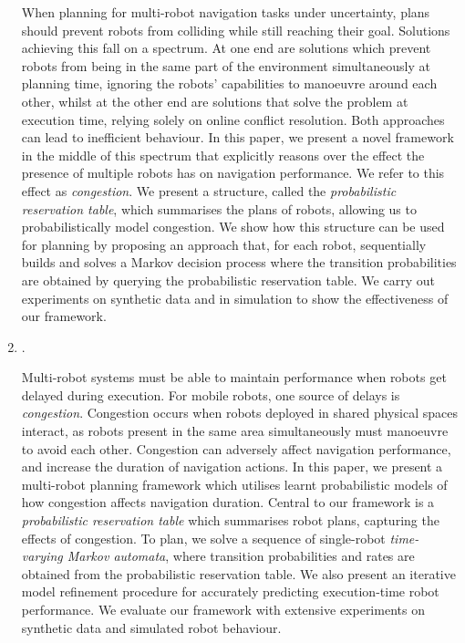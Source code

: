 \documentclass[12pt]{article}
\begin{document}
\begin{enumerate}
When planning for multi-robot navigation tasks under uncertainty, plans should prevent robots from colliding while still reaching their goal. 
%
Solutions achieving this fall on a spectrum. 
%
At one end are solutions which prevent robots from being in the same part of the environment simultaneously at planning time, ignoring the robots' capabilities to manoeuvre around each other, whilst at the other end are solutions that solve the problem at execution time, relying solely on online conflict resolution. 
%
Both approaches can lead to inefficient behaviour. 
%
In this paper, we present a novel framework in the middle of this spectrum that explicitly reasons over the effect the presence of multiple robots has on navigation performance. 
%
We refer to this effect as \emph{congestion}. 
%
We present a structure, called the \emph{probabilistic reservation table}, which summarises the plans of robots, allowing us to probabilistically model congestion.
%
We show how this structure can be used for planning by proposing an approach that, for each robot, sequentially builds and solves a Markov decision process where the transition probabilities are obtained by querying the probabilistic reservation table.
%
We carry out experiments on synthetic data and in simulation to show the effectiveness of our framework.

\item {}.

Multi-robot systems must be able to maintain performance when robots get delayed during execution.
%
For mobile robots, one source of delays is \emph{congestion}.
%
Congestion occurs when robots deployed in shared physical spaces interact, as robots present in the same area simultaneously must manoeuvre to avoid each other.
%
Congestion can adversely affect navigation performance, and increase the duration of navigation actions.
%
In this paper, we present a multi-robot planning framework which utilises learnt probabilistic models of how congestion affects navigation duration. 
%
Central to our framework is a \emph{probabilistic reservation table} which summarises robot plans, capturing the effects of congestion.
%
To plan, we solve a sequence of single-robot \emph{time-varying Markov automata}, where transition probabilities and rates are obtained from the probabilistic reservation table.
% 
We also present an iterative model refinement procedure for accurately predicting execution-time robot performance.
% 
We evaluate our framework with extensive experiments on synthetic data and simulated robot behaviour.

\end{enumerate}
\end{document}
